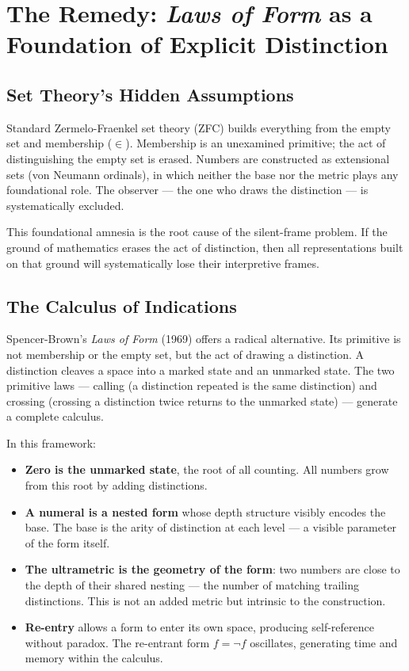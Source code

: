 \documentclass[12pt,a4paper]{article}
\theoremstyle{definition}
\theoremstyle{remark}
\begin{document}
\section{The Remedy: \emph{Laws of Form} as a Foundation of Explicit Distinction}

\subsection{Set Theory's Hidden Assumptions}

Standard Zermelo-Fraenkel set theory (ZFC) builds everything from the empty set and
membership ($\in$). Membership is an unexamined primitive; the act of
distinguishing the empty set is erased. Numbers are constructed as extensional sets
(von Neumann ordinals), in which neither the base nor the metric plays any
foundational role. The observer --- the one who draws the distinction --- is
systematically excluded.

This foundational amnesia is the root cause of the silent-frame problem. If the
ground of mathematics erases the act of distinction, then all representations built
on that ground will systematically lose their interpretive frames.

\subsection{The Calculus of Indications}

Spencer-Brown's \emph{Laws of Form} (1969) offers a radical alternative. Its
primitive is not membership or the empty set, but the act of drawing a distinction.
A distinction cleaves a space into a marked state and an unmarked state. The two
primitive laws --- calling (a distinction repeated is the same distinction) and
crossing (crossing a distinction twice returns to the unmarked state) --- generate
a complete calculus.

In this framework:
\begin{itemize}[nosep]
  \item \textbf{Zero is the unmarked state}, the root of all counting. All numbers
        grow from this root by adding distinctions.
  \item \textbf{A numeral is a nested form} whose depth structure visibly encodes
        the base. The base is the arity of distinction at each level --- a visible
        parameter of the form itself.
  \item \textbf{The ultrametric is the geometry of the form}: two numbers are close
        to the depth of their shared nesting --- the number of matching trailing
        distinctions. This is not an added metric but intrinsic to the construction.
  \item \textbf{Re-entry} allows a form to enter its own space, producing
        self-reference without paradox. The re-entrant form $f = \neg f$ oscillates,
        generating time and memory within the calculus.
\end{itemize}
\end{document}
